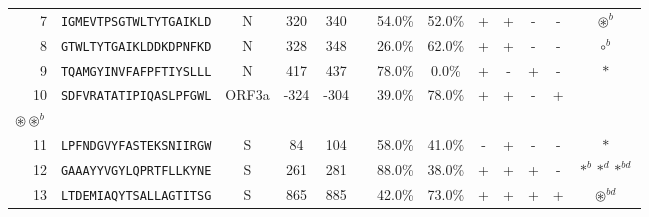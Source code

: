 \begin{tabular}{rcccccccccccc}
7  &  \texttt{IGMEVTPSGTWLTYTGAIKLD} &       N &    320 &   340 &                &                          54.0\% &                           52.0\% &          + &           + &          - &           - &                                                                                                             $ \circledast^b $ \\
8  &  \texttt{GTWLTYTGAIKLDDKDPNFKD} &       N &    328 &   348 &                &                          26.0\% &                           62.0\% &          + &           + &          - &           - &                                                                                                                   $ \circ^b $ \\
9  &  \texttt{TQAMGYINVFAFPFTIYSLLL} &       N &    417 &   437 &                &                          78.0\% &                            0.0\% &          + &           - &          + &           - &                                                                                                                      $ \ast $ \\
10 &  \texttt{SDFVRATATIPIQASLPFGWL} &   ORF3a &   -324 &  -304 &                &                          39.0\% &                           78.0\% &          + &           + &          - &           + &                                           \Centerstack{  $\circ \circ^d \circ^b \circ^{bd}$ \\  $\circledast \circledast^b$ } \\
11 &  \texttt{LPFNDGVYFASTEKSNIIRGW} &       S &     84 &   104 &                &                          58.0\% &                           41.0\% &          - &           + &          - &           - &                                                                                                                      $ \ast $ \\
12 &  \texttt{GAAAYYVGYLQPRTFLLKYNE} &       S &    261 &   281 &                &                          88.0\% &                           38.0\% &          + &           + &          + &           - &                                                                                                   $ \ast^b \ast^d \ast^{bd} $ \\
13 &  \texttt{LTDEMIAQYTSALLAGTITSG} &       S &    865 &   885 &                &                          42.0\% &                           73.0\% &          + &           + &          + &           + &                                                                                                          $ \circledast^{bd} $ \\

\end{tabular}
